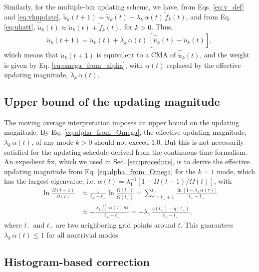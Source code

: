 \documentclass[preprint, superscriptaddress, floatfix]{revtex4-1}
\begin{document}
Similarly, for the multiple-bin updating scheme,
we have, from Eqs. \eqref{eq:v_def} and \eqref{eq:vkupdate},
${\tilde u}_k(t + 1) = {\tilde u}_k(t) + \lambda_k \, \alpha(t) \, {\tilde f}_k(t)$,
and from Eq. \eqref{eq:uhatt},
$\hat{\tilde u}_k(t) \approx {\tilde u}_k(t) + {\tilde f}_k(t)$,
for $k > 0$.
Thus,
\begin{align*}
  \tilde u_k(t+1) = \tilde u_k(t) + \lambda_k \, \alpha(t) \,
  \left[
    \hat{\tilde u}_k(t) - \tilde u_k(t)
  \right]
  ,
\end{align*}
%
which means that
$\tilde u_k(t+1)$ is equivalent to
a CMA of $\hat{\tilde u}_k(t)$,
and the weight is given by Eq. \eqref{eq:omega_from_alpha},
with $\alpha(t)$ replaced by the effective updating magnitude,
$\lambda_k \, \alpha(t)$.



\subsection{\label{sec:ave_ub}
Upper bound of the updating magnitude}

The moving average interpretation imposes
an upper bound on the updating magnitude.
%
By Eq. \eqref{eq:alpha_from_Omega},
the effective updating magnitude, $\lambda_k \, \alpha(t)$,
of any mode $k > 0$
should not exceed $1.0$.
But this is not necessarily satisfied
for the updating schedule
derived from the continuous-time formalism.
%
An expedient fix,
which we used in Sec. \ref{sec:procedure},
is to derive the effective updating magnitude
from Eq. \eqref{eq:alpha_from_Omega}
for the $k = 1$ mode, which has the largest eigenvalue,
i.e.
$\alpha(t) = \lambda_1^{-1}[1-\Omega(t-1)/\Omega(t)]$,
with
\begin{align*}
  \ln \frac{ \Omega(t-1) } { \Omega(t) }
  &\approx
  \frac{1}{t_+ - t_-} \ln \frac{ \Omega(t_-) } { \Omega(t_+) }
  =
  \!\!\sum_{\tau=t_- + 1}^{t_+}
  \frac{ \ln[1- \lambda_1 \, \alpha(\tau)] } { t_+ - t_- }
  \\
  &\approx
  -\frac{ \lambda_1 \int_{t_-}^{t_+} \alpha(\tau) \, d\tau}{t_+ - t_-}
  =
  -\lambda_1 \, \frac{q(t_+) - q(t_-)}{t_+ - t_-}
  ,
\end{align*}
where $t_-$ and $t_+$ are two neighboring grid points
around $t$.
%
This guarantees $\lambda_k \, \alpha(t) \le 1$
for all nontrivial modes.



\subsection{Histogram-based correction}
\end{document}
